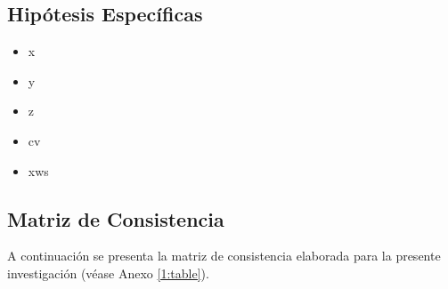 \subsection{Hipótesis Específicas}
\newcommand{\Hone}{
	x
}
\newcommand{\Htwo}{
	y
}
\newcommand{\Hthree}{
	z	
}
\newcommand{\Hfour}{
	cv
}
\newcommand{\Hfive}{
	xws
}
\begin{itemize}
	\item \Hone
	\item \Htwo
	\item \Hthree
	\item \Hfour
	\item \Hfive
\end{itemize}

\subsection{Matriz de Consistencia}
A continuación se presenta la matriz de consistencia elaborada para la presente investigación (véase Anexo \ref{1:table}).

